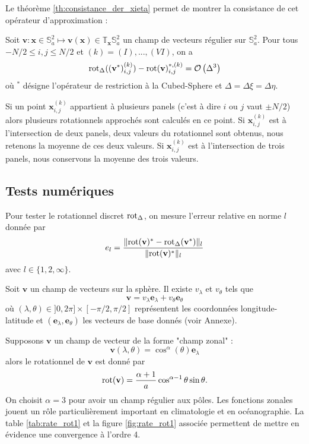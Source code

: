 Le théorème \ref{th:consistance_der_xieta} permet de montrer la consistance de cet opérateur d'approximation :

\begin{proposition}
Soit $\mathbf{v} : \mathbf{x} \in \mathbb{S}_a^2 \mapsto \mathbf{v}(\mathbf{x}) \in \mathbb{T}_{\mathbf{x}} \mathbb{S}_a^2$ un champ de vecteurs régulier sur $\mathbb{S}_a^2$. Pour tous $-N/2 \leq i,j \leq N/2$ et $(k) = (I), ..., (VI)$, on a
\begin{equation}
\text{rot}_{\Delta}((\mathbf{v}^*)_{i,j}^{(k)}) - \text{rot}(\mathbf{v})^{*,(k)}_{i,j} = \mathcal{O} \left( \Delta^3  \right) 
\end{equation}
où $^*$ désigne l'opérateur de restriction à la Cubed-Sphere et $\Delta = \Delta \xi = \Delta \eta$.
\end{proposition}

Si un point $\mathbf{x}_{i,j}^{(k)}$ appartient à plusieurs panels (c'est à dire $i$ ou $j$ vaut $\pm N/2$) alors plusieurs rotationnels approchés sont calculés en ce point. Si $\mathbf{x}_{i,j}^{(k)}$ est à l'intersection de deux panels, deux valeurs du rotationnel sont obtenus, nous retenons la moyenne de ces deux valeurs. Si $\mathbf{x}_{i,j}^{(k)}$ est à l'intersection de trois panels, nous conservons la moyenne des trois valeurs.

\subsection{Tests numériques}

Pour tester le rotationnel discret $\text{rot}_{\Delta}$, on mesure l'erreur relative en norme $l$ donnée par
\begin{equation}
e_l = \dfrac{\| \text{rot}(\mathbf{v})^* - \text{rot}_{\Delta}(\mathbf{v}^*) \|_l}{\| \text{rot}(\mathbf{v})^* \|_l}
\end{equation}
avec $l \in \lbrace 1, 2, \infty \rbrace$.

Soit $\mathbf{v}$ un champ de vecteurs sur la sphère. Il existe $v_{\lambda}$ et $v_{\theta}$ tels que 
\begin{equation}
\mathbf{v} = v_{\lambda} \mathbf{e}_{\lambda} + v_{\theta} \mathbf{e}_{\theta}
\end{equation} 
où $(\lambda,\theta) \in ]0,2\pi]\times [-\pi/2, \pi/2]$ représentent les coordonnées longitude-latitude et $(\mathbf{e}_{\lambda}, \mathbf{e}_{\theta})$ les vecteurs de base donnés (voir Annexe).

Supposons $\mathbf{v}$ un champ de vecteur de la forme "champ zonal" :
\begin{equation}
\mathbf{v}(\lambda, \theta) = \cos^{\alpha}(\theta) \mathbf{e}_{\lambda}
\label{eq:rot_test1}
\end{equation}
alors le rotationnel de $\mathbf{v}$ est donné par
\begin{equation}
\text{rot}(\mathbf{v}) = \dfrac{\alpha+1}{a} \cos^{\alpha-1} \theta \sin \theta .
\end{equation}
On choisit $\alpha = 3$ pour avoir un champ régulier aux pôles. Les fonctions zonales jouent un rôle particulièrement important en climatologie et en océanographie. La table \ref{tab:rate_rot1} et la figure \ref{fig:rate_rot1} associée permettent de mettre en évidence une convergence à l'ordre 4.


